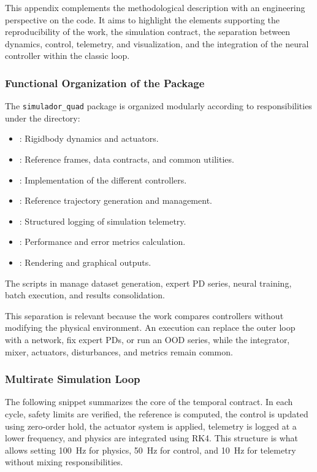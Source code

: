 This appendix complements the methodological description with an engineering perspective on the code. It aims to highlight the elements supporting the reproducibility of the work, the simulation contract, the separation between dynamics, control, telemetry, and visualization, and the integration of the neural controller within the classic loop.

\subsubsection*{Functional Organization of the Package}

The \texttt{simulador\_quad} package is organized modularly according to responsibilities under the  directory:
\begin{itemize}
    \item {}: Rigidbody dynamics and actuators.
    \item {}: Reference frames, data contracts, and common utilities.
    \item {}: Implementation of the different controllers.
    \item {}: Reference trajectory generation and management.
    \item {}: Structured logging of simulation telemetry.
    \item {}: Performance and error metrics calculation.
    \item {}: Rendering and graphical outputs.
\end{itemize}
The scripts in  manage dataset generation, expert PD series, neural training, batch execution, and results consolidation.

This separation is relevant because the work compares controllers without modifying the physical environment. An execution can replace the outer loop with a network, fix expert PDs, or run an OOD series, while the integrator, mixer, actuators, disturbances, and metrics remain common.

\subsubsection*{Multirate Simulation Loop}

The following snippet summarizes the core of the temporal contract. In each cycle, safety limits are verified, the reference is computed, the control is updated using zero-order hold, the actuator system is applied, telemetry is logged at a lower frequency, and physics are integrated using RK4. This structure is what allows setting \SI{100}{Hz} for physics, \SI{50}{Hz} for control, and \SI{10}{Hz} for telemetry without mixing responsibilities.

